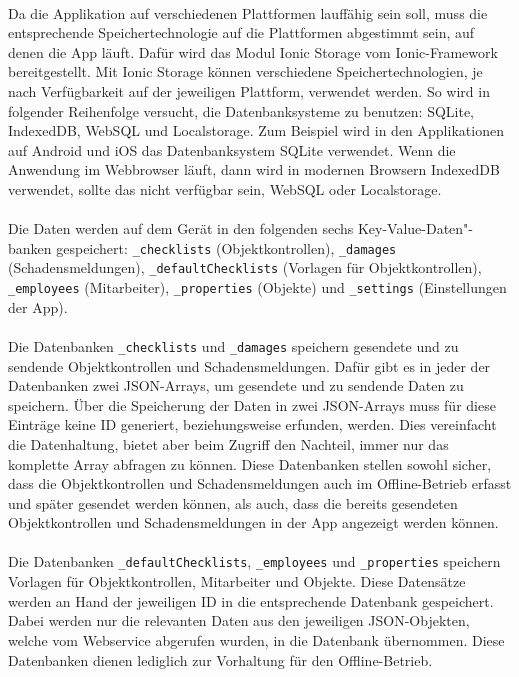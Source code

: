 \documentclass[12pt]{article}
\begin{document}
\paragraph{}Da die Applikation auf verschiedenen Plattformen lauffähig sein soll, muss die entsprechende Speichertechnologie auf die Plattformen abgestimmt sein, auf denen die App läuft. Dafür wird das Modul Ionic Storage vom Ionic-Framework bereitgestellt. Mit Ionic Storage können verschiedene Speichertechnologien, je nach Verfügbarkeit auf der jeweiligen Plattform, verwendet werden. So wird  in folgender Reihenfolge versucht, die Datenbanksysteme zu benutzen: SQLite, IndexedDB, WebSQL und Localstorage. Zum Beispiel wird in den Applikationen auf Android und iOS das Datenbanksystem SQLite verwendet. Wenn die Anwendung im Webbrowser läuft, dann wird in modernen Browsern IndexedDB verwendet, sollte das nicht verfügbar sein, WebSQL oder Localstorage. 

\paragraph{}Die Daten werden auf dem Gerät in den folgenden sechs Key-Value-Daten"-banken gespeichert: \texttt{\_checklists} (Objektkontrollen), \texttt{\_damages} (Schadensmeldungen), \texttt{\_defaultChecklists} (Vorlagen für Objektkontrollen), \texttt{\_employees} (Mitarbeiter), \texttt{\_properties} (Objekte) und \texttt{\_settings} (Einstellungen der App).

\paragraph{}Die Datenbanken \texttt{\_checklists} und \texttt{\_damages} speichern gesendete und zu sendende Objektkontrollen und Schadensmeldungen. Dafür gibt es in jeder der Datenbanken zwei JSON-Arrays, um gesendete und zu sendende Daten zu speichern. Über die Speicherung der Daten in zwei JSON-Arrays muss für diese Einträge keine ID generiert, beziehungsweise erfunden, werden. Dies vereinfacht die Datenhaltung, bietet aber beim Zugriff den Nachteil, immer nur das komplette Array abfragen zu können. Diese Datenbanken stellen sowohl sicher, dass die Objektkontrollen und Schadensmeldungen auch im Offline-Betrieb erfasst und später gesendet werden können, als auch, dass die bereits gesendeten Objektkontrollen und Schadensmeldungen in der App angezeigt werden können.

\paragraph{}Die Datenbanken \texttt{\_defaultChecklists}, \texttt{\_employees} und \texttt{\_properties} speichern Vorlagen für Objektkontrollen, Mitarbeiter und Objekte. Diese Datensätze werden an Hand der jeweiligen ID in die entsprechende Datenbank gespeichert. Dabei werden nur die relevanten Daten aus den jeweiligen JSON-Objekten, welche vom Webservice abgerufen wurden, in die Datenbank übernommen. Diese Datenbanken dienen lediglich zur Vorhaltung für den Offline-Betrieb.
\end{document}
